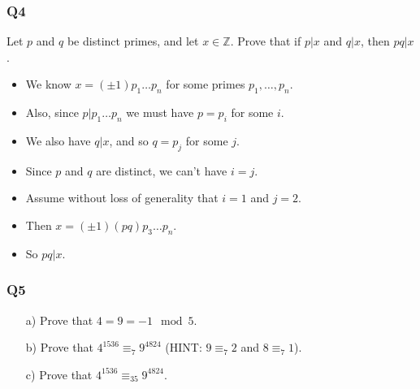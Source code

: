 \documentclass[handout]{beamer}
\newcommand{\bZ}{\mathbb{Z}}
\begin{document}
\begin{frame}
\frametitle{Q4}
Let $p$ and $q$ be distinct primes, and let $x\in\bZ$. Prove that if $p|x$ and $q|x$, then $pq|x$.
\vspace{0.5cm}
\begin{itemize}
\item We know $x = (\pm 1)p_1\ldots p_n$ for some primes $p_1,\ldots, p_n$.
\vspace{0.2cm}
\item Also, since $p|p_1\ldots p_n$ we must have $p = p_i$ for some $i$. 
\vspace{0.2cm}
\item We also have $q|x$, and so $q = p_j$ for some $j$. 
\vspace{0.2cm}
\item Since $p$ and $q$ are distinct, we can't have $i = j$.
\vspace{0.2cm} 
\item Assume without loss of generality that $i=1$ and $j=2$. 
\vspace{0.2cm}
\item Then $x = (\pm 1)(pq)p_3\ldots p_n$. 
\vspace{0.2cm}
\item So $pq|x$.
\end{itemize}
\end{frame}

\begin{frame}
\frametitle{Q5}
\begin{enumerate}
\item[a)] Prove that $4 = 9 = -1 \mod 5$. 
\item[b)] Prove that $4^{1536}\equiv_7 9^{4824}$ (HINT: $9\equiv_7 2$ and $8\equiv_7 1$).
\item[c)] Prove that $4^{1536}\equiv_{35} 9^{4824}$.
\end{enumerate}
\end{frame}
\end{document}
